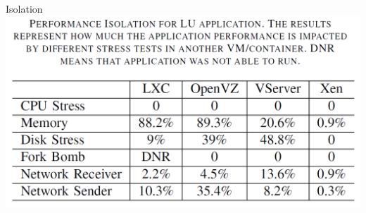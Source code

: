 \begin{frame}{Isolation}
	\includegraphics[width=\textwidth]{img/isolation_benchmark_suite.png}
\end{frame}